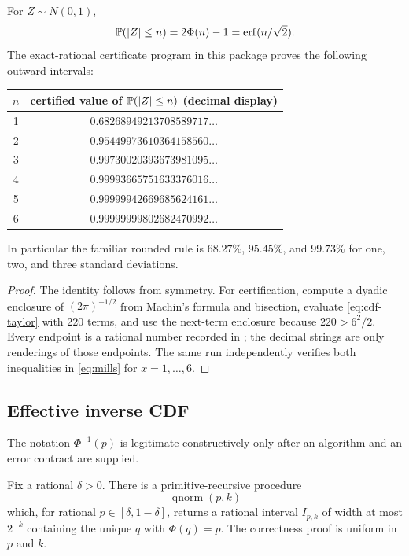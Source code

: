 \begin{corollary}\label{cor:coverage}
For $Z\sim N(0,1)$,
\[
 \mathbb P(|Z|\le n)=2\Phi(n)-1=\operatorname{erf}(n/\sqrt2).
\]
The exact-rational certificate program in this package proves the following outward intervals:
\begin{center}
\begin{tabular}{c c}
\toprule
$n$ & certified value of $\mathbb P(|Z|\le n)$ (decimal display)\\
\midrule
1 & $0.68268949213708589717\ldots$\\
2 & $0.95449973610364158560\ldots$\\
3 & $0.99730020393673981095\ldots$\\
4 & $0.99993665751633376016\ldots$\\
5 & $0.99999942669685624161\ldots$\\
6 & $0.99999999802682470992\ldots$\\
\bottomrule
\end{tabular}
\end{center}
In particular the familiar rounded rule is $68.27\%$, $95.45\%$, and $99.73\%$ for one, two, and three standard deviations.
\end{corollary}

\begin{proof}
The identity follows from symmetry.  For certification, compute a dyadic enclosure of $(2\pi)^{-1/2}$ from Machin's formula and bisection, evaluate \eqref{eq:cdf-taylor} with 220 terms, and use the next-term enclosure because $220>6^2/2$.  Every endpoint is a rational number recorded in ; the decimal strings are only renderings of those endpoints.  The same run independently verifies both inequalities in \eqref{eq:mills} for $x=1,\dots,6$.
\end{proof}

\subsection{Effective inverse CDF}

The notation $\Phi^{-1}(p)$ is legitimate constructively only after an algorithm and an error contract are supplied.

\begin{theorem}\label{thm:quantile}
Fix a rational $\delta>0$.  There is a primitive-recursive procedure
\[
 \operatorname{qnorm}(p,k)
\]
which, for rational $p\in[\delta,1-\delta]$, returns a rational interval $I_{p,k}$ of width at most $2^{-k}$ containing the unique $q$ with $\Phi(q)=p$.  The correctness proof is uniform in $p$ and $k$.
\end{theorem}

